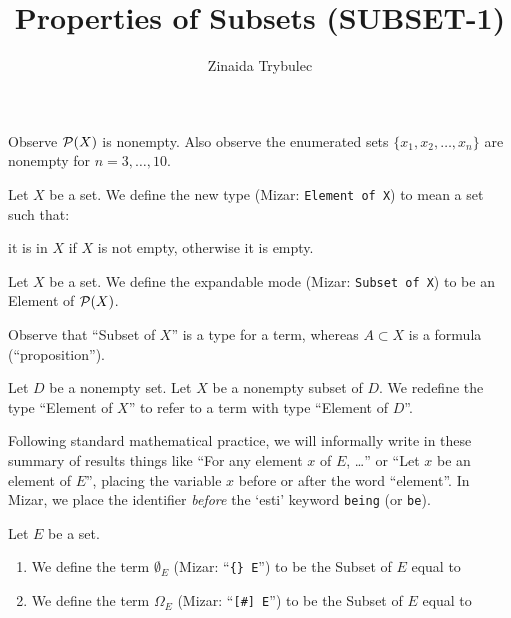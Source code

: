 \documentclass{article}
\title{Properties of Subsets (SUBSET-1)}
\author{Zinaida Trybulec}
\begin{document}
\maketitle

Observe $\mathcal{P}(X)$ is nonempty. Also observe the enumerated sets
$\{x_{1},x_{2},\dots,x_{n}\}$ are nonempty for $n=3,\dots,10$.

\begin{definition}
Let $X$ be a set.
We define the new type  (Mizar: \verb#Element of X#)
to mean a set such that:
\begin{defn}
\item it is in $X$ if $X$ is not empty, otherwise it is empty.
\end{defn}
\end{definition}

\begin{definition}
Let $X$ be a set. We define the expandable mode 
(Mizar: \verb#Subset of X#)
to be an Element of $\mathcal{P}(X)$.
\end{definition}

\begin{remark}
Observe that ``Subset of $X$'' is a type for a term, whereas $A\subset X$
is a formula (``proposition'').
\end{remark}

\begin{definition}
Let $D$ be a nonempty set. Let $X$ be a nonempty subset of $D$.
We redefine the type ``Element of $X$'' to refer to a term with type
``Element of $D$''.
\end{definition}

\begin{remark}
Following standard mathematical practice, we will informally write in
these summary of results things like ``For any element $x$ of $E$, \dots''
or ``Let $x$ be an element of $E$'', placing the variable $x$ before or
after the word ``element''. In Mizar, we place the identifier \emph{before}
the `esti' keyword \verb#being# (or \verb#be#).
\end{remark}

\begin{definition}
Let $E$ be a set.
\begin{enumerate}
\item We define the term $\emptyset_{E}$ (Mizar: ``\verb#{} E#'') to be
  the Subset of $E$ equal to
  \begin{defn}
  \item $\emptyset$
  \end{defn}
\item We define the term $\Omega_{E}$ (Mizar: ``\verb|[#] E|'') to be
  the Subset of $E$ equal to
\end{enumerate}
\end{definition}
\end{document}
